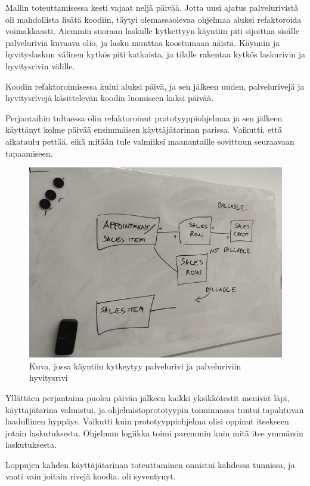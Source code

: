 Mallin toteuttamisessa kesti vajaat neljä päivää. Jotta uusi ajatus
palvelurivistä oli mahdollista lisätä koodiin, täytyi olemassaolevaa
ohjelmaa aluksi refaktoroida voimakkaasti. Aiemmin suoraan laskulle
kytkettyyn käyntiin piti sijoittaa sisälle palveluriviä kuvaava olio, ja
lasku muuttaa koostumaan näistä. Käynnin ja hyvityslaskun välinen kytkös
piti katkaista, ja tilalle rakentaa kytkös laskurivin ja hyvitysrivin
välille.

Koodin refaktoroimisessa kului aluksi päivä, ja sen jälkeen uuden,
palvelurivejä ja hyvitysrivejä käsittelevän koodin luomiseen kaksi
päivää.

Perjantaihin tultaessa olin refaktoroinut prototyyppiohjelmaa ja sen
jälkeen käyttänyt kolme päivää ensimmäisen käyttäjätarinan parissa.
Vaikutti, että aikataulu pettää, eikä mitään tule valmiiksi maanantaille
sovittuun seuraavaan tapaamiseen.

\begin{figure}
\centering
\includegraphics{illustration/final-idea-1.jpg}
\caption{\label{finalmodel1} Kuva, jossa käyntiin kytkeytyy palvelurivi
ja palveluriviin hyvitysrivi}
\end{figure}

Yllättäen perjantaina puolen päivän jälkeen kaikki yksikkötestit menivät
läpi, käyttäjätarina valmistui, ja ohjelmistoprototyypin toiminnassa
tuntui tapahtuvan laadullinen hyppäys. Vaikutti kuin prototyyppiohjelma
olisi oppinut itsekseen jotain laskutuksesta. Ohjelman logiikka toimi
paremmin kuin mitä itse ymmärsin laskutuksesta.

Loppujen kahden käyttäjätarinan toteuttaminen onnistui kahdessa
tunnissa, ja vaati vain joitain rivejä koodia.
 oli syventynyt.

